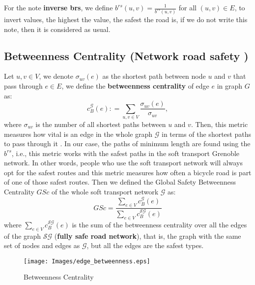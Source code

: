 \documentclass[letterpaper, 10 pt, conference]{ieeeconf}  %
\begin{document}
For the note \textbf{inverse brs}, we define $b^{rs} (u,v) = \frac{1}{b^{rs} (u,v)}$ for all $(u,v) \in E$, to invert values, the highest the value, the safest the road is, if we do not write this note, then it is considered as usual.
\subsection{Betweenness Centrality (Network road safety ) }
Let $u,v \in V$, we denote $\sigma_{uv}(e)$ as the shortest path between node $u$ and $v$ that pass through $e \in E$, we define the \textbf{betweenness centrality} of edge $e$ in graph $G$ as:
\begin{equation}
  c_{B}^{\mathcal{G}}(e) \colon = \sum_{u,v \in V} \frac{\sigma_{uv}(e)}{\sigma_{uv}},  
\end{equation}
where $\sigma_{uv}$ is the number of all shortest paths between $u$ and $v$. Then, this metric measures how vital is an edge in the whole graph $\mathcal{G}$ in terms of the shortest paths to pass through it \cite{aydin2018integration}. In our case, the paths of minimum length are found using the $b^{rs}$, i.e., this metric works with the safest paths in the soft transport Grenoble network. In other words, people who use the soft transport network will always opt for the safest routes and this metric measures how often a bicycle road is part of one of those safest routes.
Then we defined the Global Safety Betweenness Centrality $GSc$ of the whole soft transport network $\mathcal{G}$ as:
\begin{equation}
   GSc = \frac{\sum_{e \in V} c_{B}^{\mathcal{G}}(e)}{\sum_{e \in V} c_{B}^{\mathcal{SG}}(e)}
\end{equation}
where $\sum_{e \in V} c_{B}^{\mathcal{SG}}(e)$ is the sum of the betweenness centrality over all the edges of the graph $\mathcal{SG}$ (\textbf{fully safe road network}), that is, the graph with the same set of nodes and edges as $\mathcal{G}$,  but all the edges are the safest types.
\begin{figure}
    \centering
    \texttt{[image: Images/edge\_betweenness.eps]}
    \caption{Betweenness Centrality}
    \label{bc_academic_example}
\end{figure}
\end{document}
